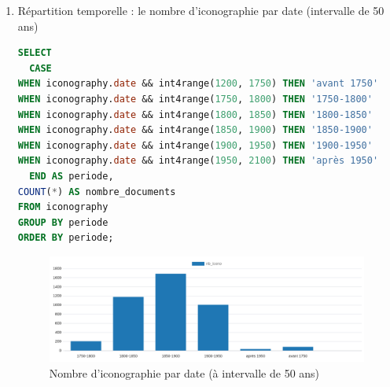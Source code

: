 \begin{enumerate}
\begin{enumerate}
        \item Répartition temporelle : le nombre d'iconographie par date (intervalle de 50 ans)
            \begin{lstlisting}[language=SQL, caption=Nombre d'iconographies par date (intervalle de 50 ans)]
SELECT 
  CASE 
WHEN iconography.date && int4range(1200, 1750) THEN 'avant 1750' 
WHEN iconography.date && int4range(1750, 1800) THEN '1750-1800' 
WHEN iconography.date && int4range(1800, 1850) THEN '1800-1850' 
WHEN iconography.date && int4range(1850, 1900) THEN '1850-1900' 
WHEN iconography.date && int4range(1900, 1950) THEN '1900-1950' 
WHEN iconography.date && int4range(1950, 2100) THEN 'après 1950' 
  END AS periode, 
COUNT(*) AS nombre_documents 
FROM iconography 
GROUP BY periode 
ORDER BY periode; \end{lstlisting}

            \begin{figure}[ht!]
                    \centering
                    \includegraphics[width=1\linewidth]{images/graphiques/nb_icono_date_50.png}
                    \caption{Nombre d'iconographie par date (à intervalle de 50 ans)}
                    \label{fig:nb_icono_date50}
                \end{figure}

\newpage


\end{enumerate}
\end{enumerate}
